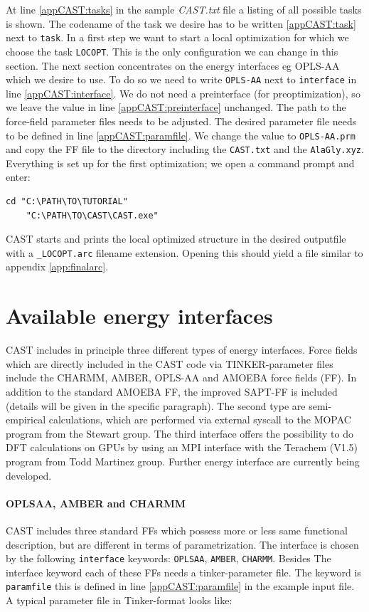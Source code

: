 \documentclass[a4paper,11pt]{scrartcl}
\begin{document}
At line \ref{appCAST:tasks} in the sample \textit{CAST.txt} file a listing of all possible tasks is shown. The codename of the task we desire has to be written \ref{appCAST:task} next to \texttt{task}. In a first step we want to start a local optimization for which we choose the task \texttt{LOCOPT}. This is the only configuration we can change in this section. The next section concentrates on the energy interfaces \ac{eg} OPLS-AA which we desire to use. To do so we need to write \texttt{OPLS-AA} next to \texttt{interface} in line \ref{appCAST:interface}. We do not need a preinterface (for preoptimization), so we leave the value in line \ref{appCAST:preinterface} unchanged. %
The path to the force-field parameter files needs to be adjusted. The desired parameter file needs to be defined in line \ref{appCAST:paramfile}. We change the value to \texttt{OPLS-AA.prm} and copy the FF file to the directory including the \texttt{CAST.txt} and the \texttt{AlaGly.xyz}. Everything is set up for the first optimization; we open a command prompt and enter: 
\begin{lstlisting}[frame=single,]
	cd "C:\PATH\TO\TUTORIAL"
	"C:\PATH\TO\CAST\CAST.exe"
\end{lstlisting}

CAST starts and prints the local optimized structure in the desired outputfile with a \texttt{\_LOCOPT.arc} filename extension. Opening this should yield a file similar to appendix \ref{app:finalarc}.


\section{Available energy interfaces}

CAST includes in principle three different types of energy interfaces. Force fields which are directly included in the CAST code via TINKER-parameter files include the CHARMM, AMBER, OPLS-AA and AMOEBA force fields (FF). In addition to the standard AMOEBA FF, the improved SAPT-FF is included (details will be given in the specific paragraph). The second type are semi-empirical calculations, which are performed via external syscall to the MOPAC program from the Stewart group. The third interface offers the possibility to do DFT calculations on GPUs by using an MPI interface with the Terachem (V1.5) program from Todd Martinez group. Further energy interface are currently being developed.

\paragraph{OPLSAA, AMBER and CHARMM}
CAST includes three standard FFs which possess more or less same functional description, but are different in terms of parametrization. The interface is chosen by the following \texttt{interface} keywords: \texttt{OPLSAA}, \texttt{AMBER}, \texttt{CHARMM}. Besides The interface keyword each of these FFs needs a tinker-parameter file. The keyword is \texttt{paramfile} this is defined in line \ref{appCAST:paramfile} in the example input file. A typical parameter file in Tinker-format looks like:
\end{document}
